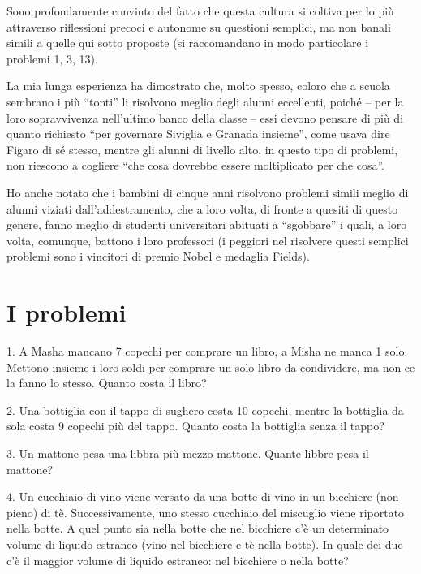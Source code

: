 Sono profondamente convinto del fatto che questa cultura si coltiva per lo più attraverso riflessioni precoci e autonome su questioni semplici, ma non banali simili a quelle qui sotto proposte (si raccomandano in modo particolare i problemi 1, 3, 13).

La mia lunga esperienza ha dimostrato che, molto spesso, coloro che a scuola sembrano i più \enquote{tonti} li risolvono meglio degli alunni eccellenti, poiché 
 -- per la loro sopravvivenza nell’ultimo banco della classe -- essi devono pensare di più di quanto richiesto \enquote{per governare Siviglia e Granada insieme}, come usava dire Figaro di sé stesso, mentre gli alunni di livello alto, in questo tipo di problemi, non riescono a cogliere \enquote{che cosa dovrebbe essere moltiplicato per che cosa}.

Ho anche notato che i bambini di cinque anni risolvono problemi simili meglio di alunni viziati dall’addestramento, che a loro volta, di fronte a quesiti di questo genere, fanno meglio di studenti universitari abituati a \enquote{sgobbare} i quali, a loro volta, comunque, battono i loro professori (i peggiori nel risolvere questi semplici problemi sono i vincitori di premio Nobel e medaglia Fields).   

\clearpage
\section*{I problemi}

\begin{problem}{1.}
	A Masha mancano 7 copechi per comprare un libro, a Misha ne manca 1 solo. Mettono insieme i loro soldi per comprare un solo libro da condividere, ma non ce la fanno lo stesso. Quanto costa il libro?
\end{problem}

\begin{problem}{2.}
	Una bottiglia con il tappo di sughero costa 10 copechi, mentre la bottiglia da sola costa 9 copechi più del tappo. Quanto costa la bottiglia senza il tappo?
\end{problem}

\begin{problem}{3.}
	Un mattone pesa una libbra più mezzo mattone. Quante libbre pesa il mattone?
\end{problem}

\begin{problem}{4.}
	Un cucchiaio di vino viene versato da una botte di vino in un bicchiere (non pieno) di tè. Successivamente, uno stesso cucchiaio del miscuglio viene riportato nella botte. A quel punto sia nella botte che nel bicchiere c’è un determinato volume di liquido estraneo (vino nel bicchiere e tè nella botte). In quale dei due c’è il maggior volume di liquido estraneo: nel bicchiere o nella botte?
\end{problem}

